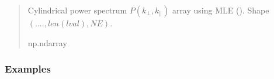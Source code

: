 \documentclass[a4paper,11pt,oneside,english,openany]{sphinxmanual}
\begin{document}
\begin{fulllineitems}
\begin{quote}
\begin{description}
\begin{itemize}
\end{itemize}

\sphinxAtStartPar
{} \textendash{} Cylindrical power spectrum \(P(k_{\perp},k_{\parallel})\) array using MLE (). Shape \((....,len(lval),N\!E)\).

\sphinxAtStartPar

\sphinxAtStartPar
np.ndarray
\clearpage

\end{description}\end{quote}
\subsubsection*{Examples}


\end{fulllineitems}
\end{document}
